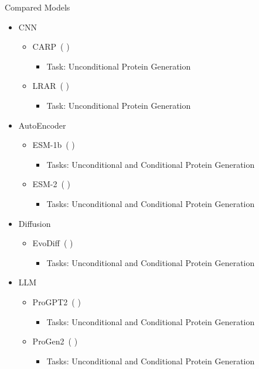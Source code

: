 \documentclass[dvipsnames,
hyperref={
	citecolor=blue,
	colorlinks=true,
	urlcolor=blue,
	linkcolor=,
}
]{beamer}
\let\oldcite\cite
\renewcommand{\cite}[1]{{\color{blue} \oldcite{#1}}}
\begin{document}
\begin{frame}{Compared Models}
	\begin{itemize}
		\item CNN
		\begin{itemize}
			\item CARP~(\cite{alamdari2023protein})
			\begin{itemize}
				\item Task: Unconditional Protein Generation
			\end{itemize}
			\item LRAR~(\cite{alamdari2023protein})
			\begin{itemize}
				\item Task: Unconditional Protein Generation
			\end{itemize}
		\end{itemize}
		\item AutoEncoder
		\begin{itemize}
			\item ESM-1b~(\cite{rives2021biological})
			\begin{itemize}
				\item Tasks: Unconditional and Conditional Protein Generation
			\end{itemize}
			\item ESM-2~(\cite{lin2023evolutionary})
			\begin{itemize}
				\item Tasks: Unconditional and Conditional Protein Generation
			\end{itemize}
		\end{itemize}
		\item Diffusion
		\begin{itemize}
			\item EvoDiff~(\cite{alamdari2023protein})
			\begin{itemize}
				\item Tasks: Unconditional and Conditional Protein Generation
			\end{itemize}
		\end{itemize}
		\item LLM
		\begin{itemize}
			\item ProGPT2~(\cite{ferruz2022protgpt2})
			\begin{itemize}
				\item Tasks: Unconditional and Conditional Protein Generation
			\end{itemize}
			\item ProGen2~(\cite{nijkamp2023progen2})
			\begin{itemize}
				\item Tasks: Unconditional and Conditional Protein Generation
			\end{itemize}
		\end{itemize}
	\end{itemize}
\end{frame}
\end{document}
